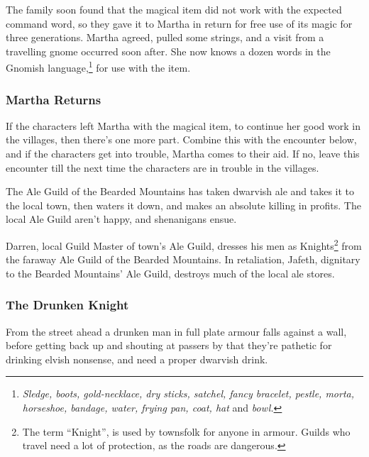 The family soon found that the magical item did not work with the expected command word, so they gave it to Martha in return for free use of its magic for three generations.  Martha agreed, pulled some strings, and a visit from a travelling gnome occurred soon after.  She now knows a dozen words in the Gnomish language,\footnote{\textit{Sledge, boots, gold-necklace, dry sticks, satchel, fancy bracelet, pestle, morta, horseshoe, bandage, water, frying pan, coat, hat} and \textit{bowl.}} for use with the item.



\subsubsection{Martha Returns}

If the characters left Martha with the magical item, to continue her good work in the villages, then there's one more part.  Combine this with the encounter below, and if the characters get into trouble, Martha comes to their aid.  If no, leave this encounter till the next time the characters are in trouble in the villages.


The Ale Guild of the Bearded Mountains has taken dwarvish ale and takes it to the local town, then waters it down, and makes an absolute killing in profits.  The local Ale Guild aren't happy, and shenanigans ensue.

Darren, local Guild Master of town's Ale Guild, dresses his men as Knights\footnote{The term ``Knight'', is used by townsfolk for anyone in armour.  Guilds who travel need a lot of protection, as the roads are dangerous.} from the faraway Ale Guild of the Bearded Mountains.  In retaliation, Jafeth, dignitary to the Bearded Mountains' Ale Guild, destroys much of the local ale stores.

\subsubsection{The Drunken Knight}

\begin{boxtext}
	From the street ahead a drunken man in full plate armour falls against a wall, before getting back up and shouting at passers by that they're pathetic for drinking elvish nonsense, and need a proper dwarvish drink.
\end{boxtext}

